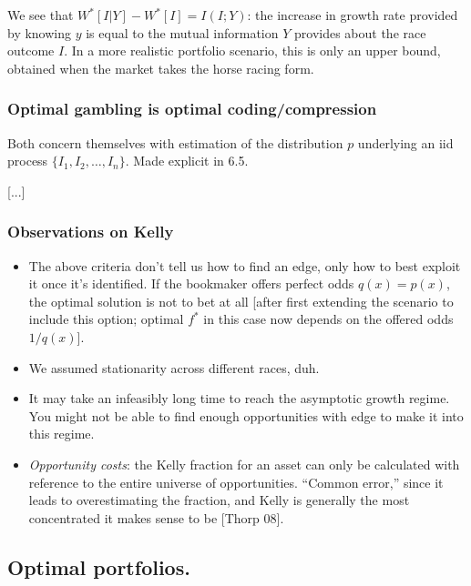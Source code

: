 \documentclass[notitlepage,openany,11pt]{report}
\theoremstyle{plain}%
\numberwithin{equation}{section}
\begin{document}
We see that $W^{\ast}[I|Y] - W^{\ast}[I] = I(I;Y)$: the increase in growth rate provided by knowing $y$ is equal to the mutual information $Y$ provides about the race outcome $I$. In a more realistic portfolio scenario, this is only an upper bound, obtained when the market takes the horse racing form. 


\subsubsection{Optimal gambling is optimal coding/compression} Both concern themselves with estimation of the distribution $p$ underlying an iid process $\{I_{1}, I_{2}, \ldots, I_{n} \}$. Made explicit in \cite{CoverThomas:91} 6.5.

[...]


\subsubsection{Observations on Kelly}
 
\begin{itemize}
\item The above criteria don't tell us how to find an edge, only how to best exploit it once it's identified. If the bookmaker offers perfect odds $q(x) = p(x)$, the optimal solution is not to bet at all [after first extending the scenario to include this option; optimal $f^{\ast}$ in this case now depends on the offered odds $1/q(x)$].

\item We assumed stationarity across different races, duh.

\item It may take an infeasibly long time to reach the asymptotic growth regime. You might not be able to find enough opportunities with edge to make it into this regime.

\item \emph{Opportunity costs}: the Kelly fraction for an asset can only be calculated with reference to the entire universe of opportunities. ``Common error,'' since it leads to overestimating the fraction, and Kelly is generally the most concentrated it makes sense to be [Thorp 08].
\end{itemize}



\subsection{Optimal portfolios.}
\end{document}
